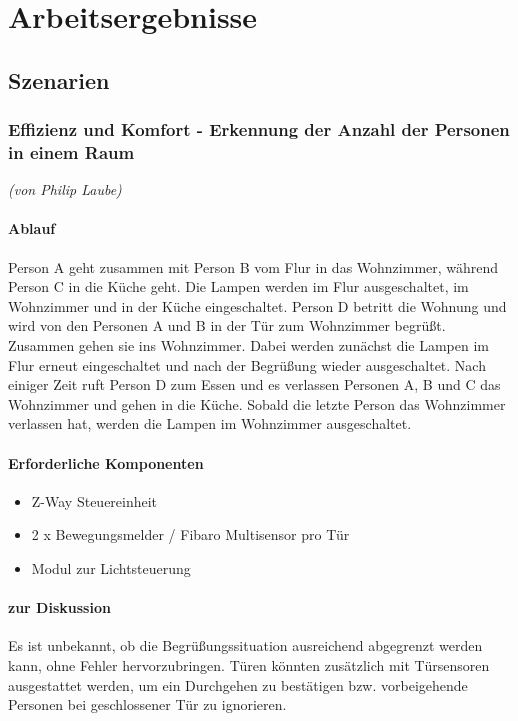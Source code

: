 \chapter{Arbeitsergebnisse}

\section{Szenarien}

\subsection{Effizienz und Komfort - Erkennung der Anzahl der Personen in einem Raum}
\label{subsec:szenarioPersonCounter}
\emph{(von Philip Laube)}
\subsubsection{Ablauf}
Person A geht zusammen mit Person B vom Flur in das Wohnzimmer, während Person C in die Küche geht.
Die Lampen werden im Flur ausgeschaltet, im Wohnzimmer und in der Küche eingeschaltet.
Person D betritt die Wohnung und wird von den Personen A und B in der Tür zum Wohnzimmer begrüßt. Zusammen gehen sie ins Wohnzimmer.
Dabei werden zunächst die Lampen im Flur erneut eingeschaltet und nach der Begrüßung wieder ausgeschaltet.
Nach einiger Zeit ruft Person D zum Essen und es verlassen Personen A, B und C das Wohnzimmer und gehen in die Küche.
Sobald die letzte Person das Wohnzimmer verlassen hat, werden die Lampen im Wohnzimmer ausgeschaltet.

\subsubsection{Erforderliche Komponenten}
\begin{itemize}
	\item Z-Way Steuereinheit
	\item 2 x Bewegungsmelder / Fibaro Multisensor pro Tür
	\item Modul zur Lichtsteuerung
\end{itemize}

\subsubsection{zur Diskussion}
Es ist unbekannt, ob die Begrüßungssituation ausreichend abgegrenzt werden kann, ohne Fehler hervorzubringen.
Türen könnten zusätzlich mit Türsensoren ausgestattet werden, um ein Durchgehen zu bestätigen bzw. vorbeigehende Personen bei geschlossener Tür zu ignorieren.


